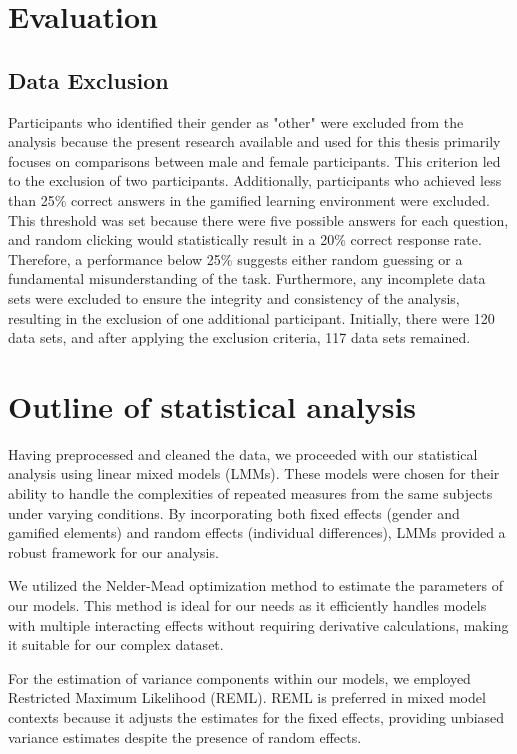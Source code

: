 
\section{Evaluation}
\label{chap:evaluation}
\subsection{Data Exclusion}
Participants who identified their gender as "other" were excluded from the analysis because the present research available and used for this thesis primarily focuses on comparisons between male and female participants.
This criterion led to the exclusion of two participants. Additionally, participants who achieved less than 25\% correct answers in the gamified learning environment were excluded.
This threshold was set because there were five possible answers for each question, and random clicking would statistically result in a 20\% correct response rate.
Therefore, a performance below 25\% suggests either random guessing or a fundamental misunderstanding of the task.
Furthermore, any incomplete data sets were excluded to ensure the integrity and consistency of the analysis, resulting in the exclusion of one additional participant.
Initially, there were 120 data sets, and after applying the exclusion criteria, 117 data sets remained.

\section{Outline of statistical analysis}
Having preprocessed and cleaned the data, we proceeded with our statistical analysis using linear mixed models (LMMs).
These models were chosen for their ability to handle the complexities of repeated measures from the same subjects under varying conditions.
By incorporating both fixed effects (gender and gamified elements) and random effects (individual differences), LMMs provided a robust framework for our analysis.

We utilized the Nelder-Mead optimization method to estimate the parameters of our models.
This method is ideal for our needs as it efficiently handles models with multiple interacting effects without requiring derivative calculations, making it suitable for our complex dataset.

For the estimation of variance components within our models, we employed Restricted Maximum Likelihood (REML).
REML is preferred in mixed model contexts because it adjusts the estimates for the fixed effects, providing unbiased variance estimates despite the presence of random effects.

